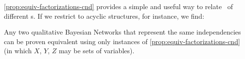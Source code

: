 %
\cref{prop:equiv-factorizations-cnd}
provides a simple and useful way to relate \scibility\ of different \hgraph s. If we restrict to acyclic structures, for instance, we find: 

\begin{theorem}[\citealt{chickering-equiv-bns}]
        \label{theorem:bn-completeness}
    Any two qualitative Bayesian Networks that 
    represent the same independencies
    can be proven equivalent using only instances of \cref{prop:equiv-factorizations-cnd}
    (in which $X$, $Y$, $Z$ may be sets of variables).
\end{theorem}

